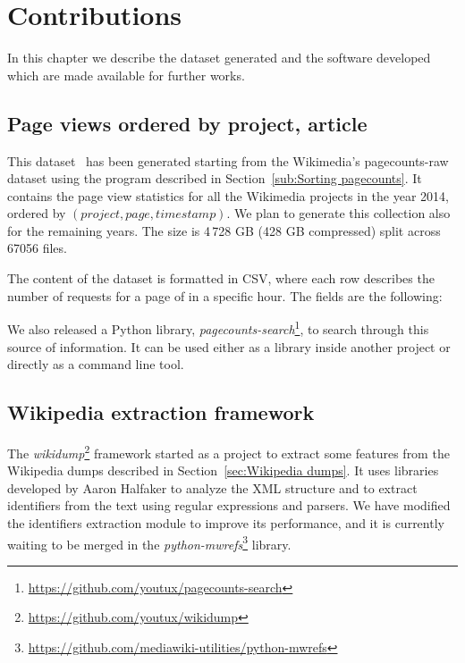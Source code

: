 \cleardoublepage{}
\chapter{Contributions}
\label{cha:Contributions}
In this chapter we describe the dataset generated and the software developed which are made available for further works.

\section{Page views ordered by project, article}
\label{sec:contrib_datasets_pagecounts}
This dataset~\cite{Bogon2016} has been generated starting from the Wikimedia's pagecounts-raw dataset using the program described in Section~\ref{sub:Sorting pagecounts}.
It contains the page view statistics for all the Wikimedia projects in the year 2014, ordered by $(project, page, timestamp)$.
We plan to generate this collection also for the remaining years.
The size is 4\,728 GB (428 GB compressed) split across 67056 files.

The content of the dataset is formatted in CSV, where each row describes the number of requests for a page of in a specific hour.
The fields are the following:

We also released a Python library, \emph{pagecounts-search}\footnote{\url{https://github.com/youtux/pagecounts-search}}, to search through this source of information.
It can be used either as a library inside another project or directly as a command line tool.

\section{Wikipedia extraction framework}
\label{sub:contrib_programs_framework}
The \emph{wikidump}\footnote{\url{https://github.com/youtux/wikidump}} framework started as a project to extract some features from the Wikipedia dumps described in Section~\ref{sec:Wikipedia dumps}.
It uses libraries developed by Aaron Halfaker to analyze the XML structure and to extract identifiers from the text using regular expressions and parsers.
We have modified the identifiers extraction module to improve its performance, and it is currently waiting to be merged in the \emph{python-mwrefs}\footnote{\url{https://github.com/mediawiki-utilities/python-mwrefs}} library.

